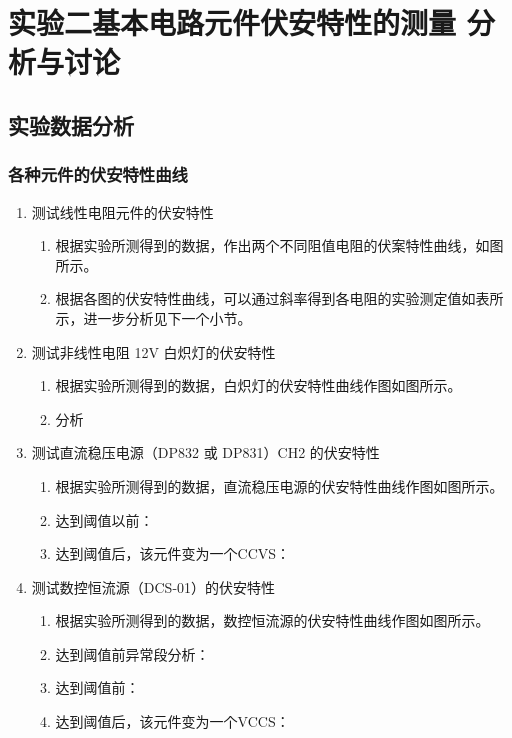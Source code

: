 \documentclass[dvipsnames, svgnames,a4paper,11pt]{article}
\begin{document}
	\section{实验二\quad 基本电路元件伏安特性的测量 \quad\heiti 分析与讨论}
	
	\subsection{实验数据分析}
	
	\subsubsection{各种元件的伏安特性曲线}
	\begin{enumerate}
		\item 测试线性电阻元件的伏安特性
		\begin{enumerate}
			\item 根据实验所测得到的数据，作出两个不同阻值电阻的伏案特性曲线，如图所示。
			
			\item 根据各图的伏安特性曲线，可以通过斜率得到各电阻的实验测定值如表所示，进一步分析见下一个小节。
		\end{enumerate}
				
		\item 测试非线性电阻 12V 白炽灯的伏安特性
		\begin{enumerate}
			\item 根据实验所测得到的数据，白炽灯的伏安特性曲线作图如图所示。
			
			\item 分析
		\end{enumerate}
				
		\item 测试直流稳压电源（DP832 或 DP831）CH2 的伏安特性
		\begin{enumerate}
			\item 根据实验所测得到的数据，直流稳压电源的伏安特性曲线作图如图所示。
			
			\item 达到阈值以前：
			
			\item 达到阈值后，该元件变为一个CCVS：
		\end{enumerate}
				
		\item 测试数控恒流源（DCS-01）的伏安特性
		\begin{enumerate}
			\item 根据实验所测得到的数据，数控恒流源的伏安特性曲线作图如图所示。
			
			\item 达到阈值前异常段分析：
			
			\item 达到阈值前：
			
			\item 达到阈值后，该元件变为一个VCCS：
		\end{enumerate}
		
	\end{enumerate}
	
\end{document}

